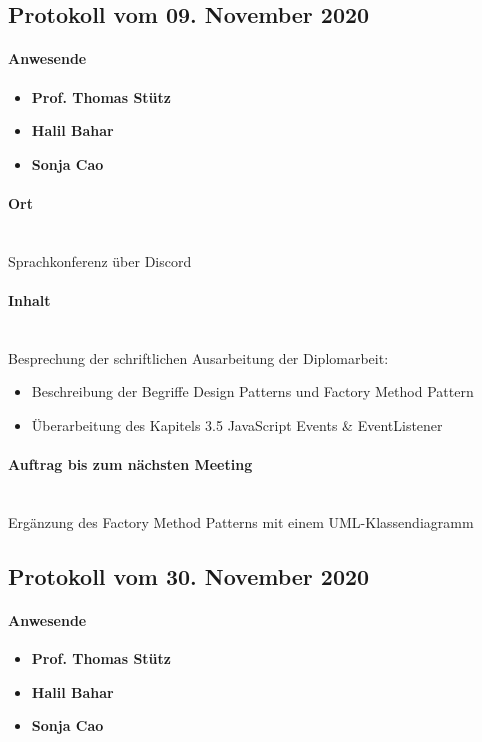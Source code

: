 \subsection{Protokoll vom 09. November 2020}

\paragraph{Anwesende}
\begin{itemize}
	\item{\textbf{Prof. Thomas Stütz}}
	\item{\textbf{Halil Bahar}}
	\item{\textbf{Sonja Cao}}
\end{itemize}

\paragraph{Ort}\mbox{}\\
Sprachkonferenz über Discord

\paragraph{Inhalt}\mbox{}\\
Besprechung der schriftlichen Ausarbeitung der Diplomarbeit:
\begin{itemize}
	\item{Beschreibung der Begriffe Design Patterns und Factory Method Pattern}
	\item{Überarbeitung des Kapitels 3.5 JavaScript Events \& EventListener}
\end{itemize}

\paragraph{Auftrag bis zum nächsten Meeting}\mbox{}\\
Ergänzung des Factory Method Patterns mit einem UML-Klassendiagramm

\subsection{Protokoll vom 30. November 2020}

\paragraph{Anwesende}
\begin{itemize}
	\item{\textbf{Prof. Thomas Stütz}}
	\item{\textbf{Halil Bahar}}
	\item{\textbf{Sonja Cao}}
\end{itemize}

